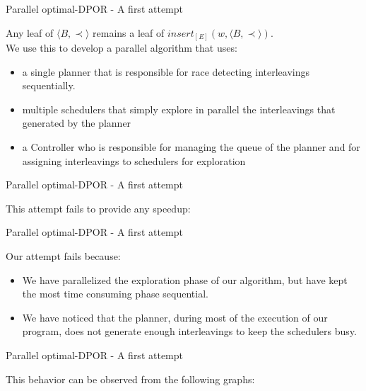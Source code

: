 \begin{frame} {Parallel optimal-DPOR - A first attempt}

Any leaf of $\langle B , \prec \rangle$ remains a leaf of $insert_{[E]}(w,\langle B , \prec \rangle)$.
\\
We use this to develop a parallel algorithm that uses:

\begin{itemize}
  \item a single planner that is responsible for race detecting interleavings sequentially.
  \item multiple schedulers that simply explore in parallel the interleavings
  that generated by the planner
  \item a Controller who is responsible for managing the queue of the planner and for assigning interleavings to schedulers for exploration
\end{itemize}

\end{frame}

\begin{frame} {Parallel optimal-DPOR - A first attempt}

This attempt fails to provide any speedup:



\end{frame}

\begin{frame} {Parallel optimal-DPOR - A first attempt}

Our attempt fails because:

\begin{itemize}[<+->]
\item We have parallelized the exploration phase of our algorithm, but have kept the most time consuming phase sequential.
\item We have noticed that the planner, during most of the execution of our program, does not generate enough interleavings to keep the schedulers busy.
\end{itemize}
\end{frame}

\begin{frame} {Parallel optimal-DPOR - A first attempt}

This behavior can be observed from the following graphs:



\end{frame}


